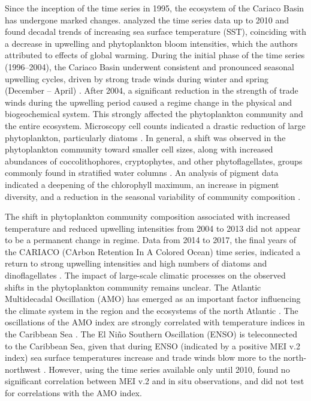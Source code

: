 \documentclass[draft]{agujournal2019}
\begin{document}
Since the inception of the time series in 1995, the ecosystem of the Cariaco Basin has undergone marked changes.  analyzed the time series data up to 2010 and found decadal trends of increasing sea surface temperature (SST), coinciding with a decrease in upwelling and phytoplankton bloom intensities, which the authors attributed to effects of global warming. During the initial phase of the time series (1996–2004), the Cariaco Basin underwent consistent and pronounced seasonal upwelling cycles, driven by strong trade winds during winter and spring (December – April) \cite{mullerkarger_annual_2001, astor_seasonal_2003}. After 2004, a significant reduction in the strength of trade winds during the upwelling period \cite{taylor_ecosystem_2012} caused a regime change in the physical and biogeochemical system. This strongly affected the phytoplankton community and the entire ecosystem. Microscopy cell counts indicated a drastic reduction of large phytoplankton, particularly diatoms \cite{pinckney_phytoplankton_2015}. In general, a shift was observed in the phytoplankton community toward smaller cell sizes, along with increased abundances of coccolithophores, cryptophytes, and other phytoflagellates, groups commonly found in stratified water columns \cite{lorenzoni_characterization_2015}. An analysis of pigment data indicated a deepening of the chlorophyll maximum, an increase in pigment diversity, and a reduction in the seasonal variability of community composition \cite{pinckney_phytoplankton_2015}. 

The shift in phytoplankton community composition associated with increased temperature and reduced upwelling intensities from 2004 to 2013 did not appear to be a permanent change in regime. Data from 2014 to 2017, the final years of the CARIACO (CArbon Retention In A Colored Ocean) time series, indicated a return to strong upwelling intensities and high numbers of diatoms and dinoflagellates \cite{muller-karger_scientific_2019}. The impact of large-scale climatic processes on the observed shifts in the phytoplankton community remains unclear. The Atlantic Multidecadal Oscillation (AMO) has emerged as an important factor influencing the climate system in the region and the ecosystems of the north Atlantic \cite{nye_ecosystem_2014}. The oscillations of the AMO index are strongly correlated with temperature indices in the Caribbean Sea \cite{stephenson_changes_2014}. The El Niño Southern Oscillation (ENSO) is teleconnected to the Caribbean Sea, given that during ENSO (indicated by a positive MEI v.2 index) sea surface temperatures increase and trade winds blow more to the north-northwest \cite{enfield_tropical_1997}. However, using the time series available only until 2010,  found no significant correlation between MEI v.2 and in situ observations, and did not test for correlations with the AMO index.
\end{document}
